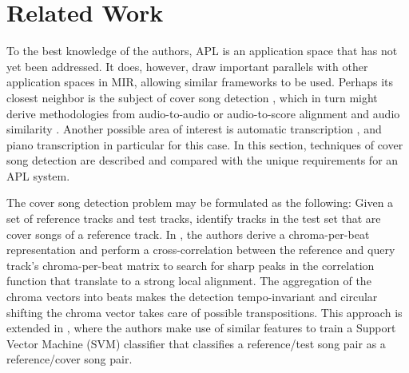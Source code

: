 \documentclass{article}
\begin{document}

\section{Related Work}

To the best knowledge of the authors, APL is an application space that has not yet been addressed. It does, however, draw important parallels with other application spaces in MIR, allowing similar frameworks to be used.  Perhaps its closest neighbor is the subject of cover song detection \cite{Ellis2007Cover,serra2008chroma,bertin2011large}, which in turn might derive methodologies from audio-to-audio or audio-to-score alignment and audio similarity \cite{hu2003polyphonic}.  Another possible area of interest is automatic transcription \cite{klapuri2004automatic}, and piano transcription \cite{raphael2002automatic} in particular for this case. In this section, techniques of cover song detection are described and compared with the unique requirements for an APL system. 


The cover song detection problem may be formulated as the following: Given a set of reference tracks and test tracks, identify tracks in the test set that are cover songs of a reference track. 
%
In \cite{Ellis2007Cover}, the authors derive a chroma-per-beat representation and perform a cross-correlation between the reference and query track's chroma-per-beat matrix to search for sharp peaks in the correlation function that translate to a strong local alignment.
The aggregation of the chroma vectors into beats makes the detection tempo-invariant and circular shifting the chroma vector takes care of possible transpositions. This approach is extended in \cite{ravuri2010cover}, where the authors make use of similar features to train a Support Vector Machine (SVM) classifier that classifies a reference/test song pair as a reference/cover song pair.  
%
\end{document}
